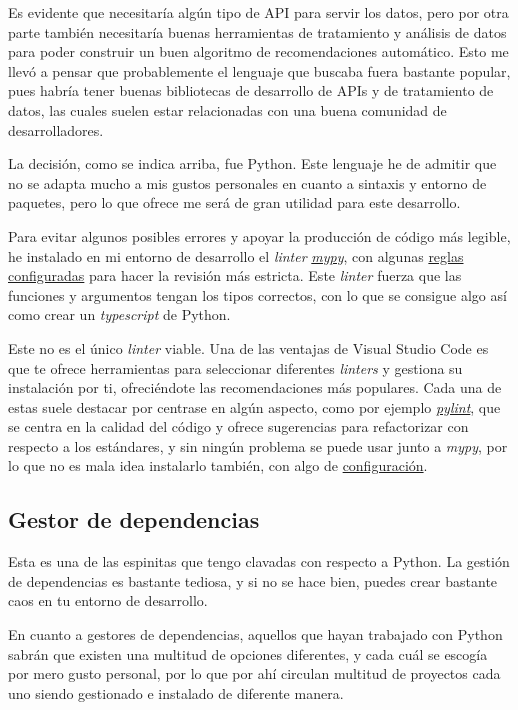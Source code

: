Es evidente que necesitaría algún tipo de API para servir los datos, pero por otra parte también necesitaría buenas herramientas de tratamiento y análisis de datos para poder construir un buen algoritmo de recomendaciones automático. Esto me llevó a pensar que probablemente el lenguaje que buscaba fuera bastante popular, pues habría tener buenas bibliotecas de desarrollo de APIs y de tratamiento de datos, las cuales suelen estar relacionadas con una buena comunidad de desarrolladores.

La decisión, como se indica arriba, fue Python. Este lenguaje he de admitir que no se adapta mucho a mis gustos personales en cuanto a sintaxis y entorno de paquetes, pero lo que ofrece me será de gran utilidad para este desarrollo.

Para evitar algunos posibles errores y apoyar la producción de código más legible, he instalado en mi entorno de desarrollo el \textit{linter} \href{http://mypy-lang.org/}{\textit{mypy}}, con algunas \href{https://github.com/Anglepi/My-Many-Reads/blob/main/.mypy.ini}{reglas configuradas} para hacer la revisión más estricta. Este \textit{linter} fuerza que las funciones y argumentos tengan los tipos correctos, con lo que se consigue algo así como crear un \textit{typescript} de Python.

Este no es el único \textit{linter} viable. Una de las ventajas de Visual Studio Code es que te ofrece herramientas para seleccionar diferentes \textit{linters} y gestiona su instalación por ti, ofreciéndote las recomendaciones más populares. Cada una de estas suele destacar por centrase en algún aspecto, como por ejemplo \href{https://pypi.org/project/pylint/}{\textit{pylint}}, que se centra en la calidad del código y ofrece sugerencias para refactorizar con respecto a los estándares, y sin ningún problema se puede usar junto a \textit{mypy}, por lo que no es mala idea instalarlo también, con algo de \href{https://github.com/Anglepi/My-Many-Reads/blob/main/.pylintrc.ini}{configuración}.

\subsection{Gestor de dependencias}

Esta es una de las espinitas que tengo clavadas con respecto a Python. La gestión de dependencias es bastante tediosa, y si no se hace bien, puedes crear bastante caos en tu entorno de desarrollo.

En cuanto a gestores de dependencias, aquellos que hayan trabajado con Python sabrán que existen una multitud de opciones diferentes, y cada cuál se escogía por mero gusto personal, por lo que por ahí circulan multitud de proyectos cada uno siendo gestionado e instalado de diferente manera.

